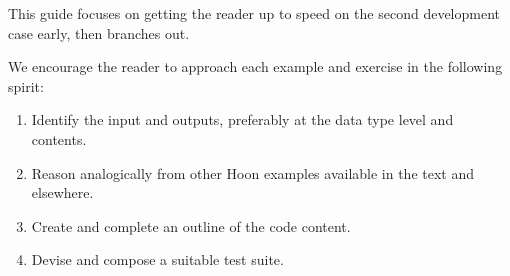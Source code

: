 
This guide focuses on getting the reader up to speed on the second development case early, then branches out.

We encourage the reader to approach each example and exercise in the following spirit:

\begin{enumerate}
  \item  Identify the input and outputs, preferably at the data type level and contents.
	\item  Reason analogically from other Hoon examples available in the text and elsewhere.
	\item  Create and complete an outline of the code content.
	\item  Devise and compose a suitable test suite.
\end{enumerate}
